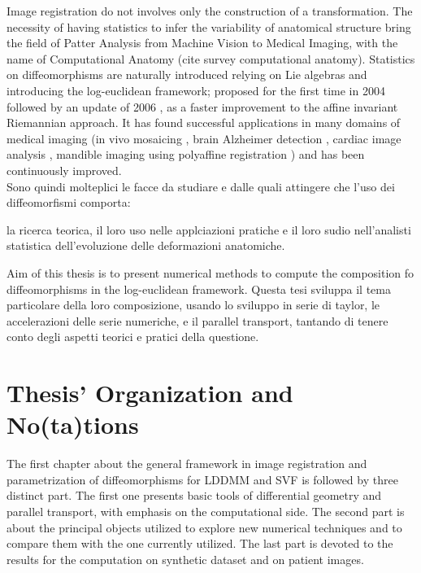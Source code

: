Image registration do not involves only the construction of a transformation. The necessity of having statistics to infer the variability of anatomical structure bring the field of Patter Analysis from Machine Vision to Medical Imaging, with the name of Computational Anatomy (cite survey computational anatomy). 
Statistics on diffeomorphisms are naturally introduced relying on Lie algebras and introducing the log-euclidean framework; proposed for the first time in 2004 \cite{Arsigny:MRM:06} followed by an update of 2006 , as a faster improvement to the affine invariant Riemannian approach. It has found successful applications in many domains of medical imaging (in vivo mosaicing \cite{Vercauteren:PHD:08}, brain Alzheimer detection \cite{Lorenzi:PhD:12}, cardiac image analysis \cite{Mansi:IJCV:11}, mandible imaging using polyaffine registration \cite{Seiler:MICCAI:11}) and has been continuously improved.\\
Sono quindi molteplici le facce da studiare e dalle quali attingere che l'uso dei diffeomorfismi comporta: 

la ricerca teorica, il loro uso nelle applciazioni pratiche e il loro sudio nell'analisti statistica dell'evoluzione delle deformazioni anatomiche. 

Aim of this thesis is to present numerical methods to compute the composition fo diffeomorphisms in the log-euclidean framework. 
Questa tesi sviluppa il tema particolare della loro composizione, usando lo sviluppo in serie di taylor, le accelerazioni delle serie numeriche, e il parallel transport, tantando di tenere conto degli aspetti teorici e pratici della questione.
 


\section*{Thesis' Organization and No(ta)tions}

The first chapter about the general framework in image registration and parametrization of diffeomorphisms for LDDMM and SVF is followed by three distinct part. The first one presents basic tools of differential geometry and parallel transport, with emphasis on the computational side. The second part is about the principal objects utilized to explore new numerical techniques and to compare them with the one currently utilized. The last part is devoted to the results for the computation on synthetic dataset and on patient images. \\

